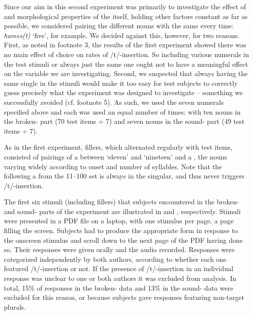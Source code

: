 \documentclass[output=paper]{langsci/langscibook}
\begin{document}
Since our aim in this second experiment was primarily to investigate the effect of  and morphological properties of the  itself, holding other factors constant as far as possible, we considered pairing the different nouns with the same  every time: \textit{ħames(t)} ‘five’, for example. We decided against this, however, for two reasons. First, as noted in footnote 3, the results of the first experiment showed there was no main effect of  choice on rates of /t/-insertion. So including various numerals in the test stimuli or always just the same one ought not to have a meaningful effect on the variable we are investigating. Second, we suspected that always having the same single  in the stimuli would make it too easy for test subjects to correctly guess precisely what the experiment was designed to investigate – something we successfully avoided (cf. footnote 5). As such, we used the seven numerals specified above and each was used an equal number of times: with ten nouns in the broken- part (70 test items ÷ 7) and seven nouns in the sound- part (49 test items ÷ 7).

As in the first experiment, fillers, which alternated regularly with test items, consisted of pairings of a  between ‘eleven’ and ‘nineteen’ and a , the nouns varying widely according to onset and number of syllables. Note that the  following a  from the 11–100 set is always in the singular, and thus never triggers /t/-insertion. 

The first six stimuli (including fillers) that subjects encountered in the broken- and sound- parts of the experiment are illustrated in  and ‎, respectively. Stimuli were presented in a PDF file on a laptop, with one stimulus per page, a page filling the screen. Subjects had to produce the appropriate form in response to the onscreen stimulus and scroll down to the next page of the PDF having done so. Their responses were given orally and the audio recorded. Responses were categorized independently by both authors, according to whether each one featured /t/-insertion or not. If the presence of /t/-insertion in an individual response was unclear to one or both authors it was excluded from analysis. In total, 15\% of responses in the broken- data and 13\% in the sound- data were excluded for this reason, or because subjects gave responses featuring non-target plurals.
\end{document}
